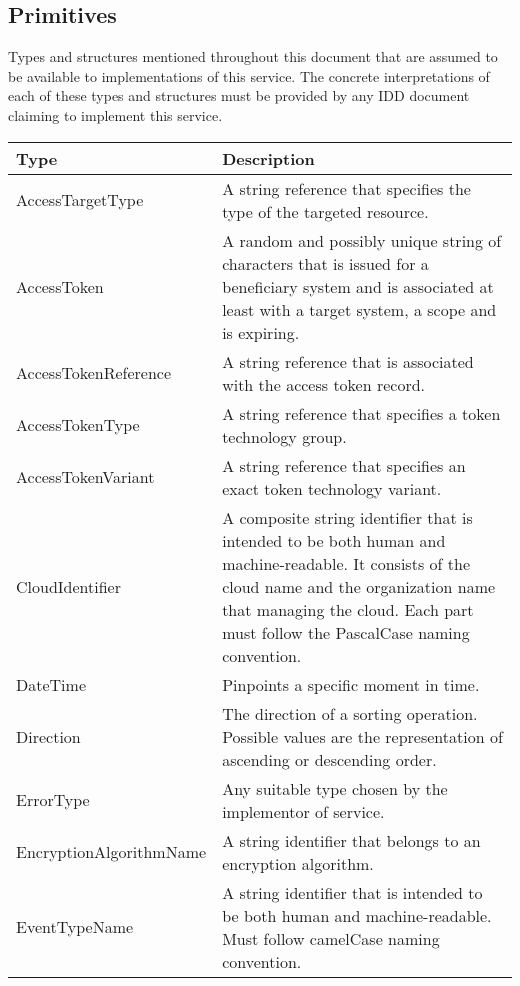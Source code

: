 \documentclass[a4paper]{arrowhead}
\newcommand{\pdef}[1]{{\textcolor{ArrowheadGrey}{#1\label{sec:model:primitives:#1}\label{sec:model:primitives:#1s}\label{sec:model:primitives:#1es}}}}
\begin{document}
\newpage

\subsection{Primitives}
\label{sec:model:primitives}

Types and structures mentioned throughout this document that are assumed to be available to implementations of this service.
The concrete interpretations of each of these types and structures must be provided by any IDD document claiming to implement this service.


\begin{table}[ht!]
\begin{tabularx}{\textwidth}{| p{5cm} | X |} \hline
\rowcolor{gray!33} Type & Description \\ \hline
\pdef{AccessTargetType} & A string reference that specifies the type of the targeted resource. \\ \hline
\pdef{AccessToken} & A random and possibly unique string of characters that is issued for a beneficiary system and is associated at least with a target system, a scope and is expiring.\\ \hline
\pdef{AccessTokenReference} & A string reference that is associated with the access token record. \\ \hline
\pdef{AccessTokenType} & A string reference that specifies a token technology group.\\ \hline
\pdef{AccessTokenVariant} & A string reference that specifies an exact token technology variant.\\ \hline
\pdef{CloudIdentifier} & A composite string identifier that is intended to be both human and machine-readable. It consists of the cloud name and the organization name that managing the cloud. Each part must follow the PascalCase naming convention. \\ \hline
\pdef{DateTime}         & Pinpoints a specific moment in time. \\ \hline
\pdef{Direction}        & The direction of a sorting operation. Possible values are the representation of ascending or descending order. \\ \hline
\pdef{ErrorType}        & Any suitable type chosen by the implementor of service. \\ \hline
\pdef{EncryptionAlgorithmName} & A string identifier that belongs to an encryption algorithm. \\ \hline
\pdef{EventTypeName}      & A string identifier that is intended to be both human and machine-readable. Must follow camelCase naming convention. \\ \hline

\end{tabularx}
\end{table}
\end{document}
